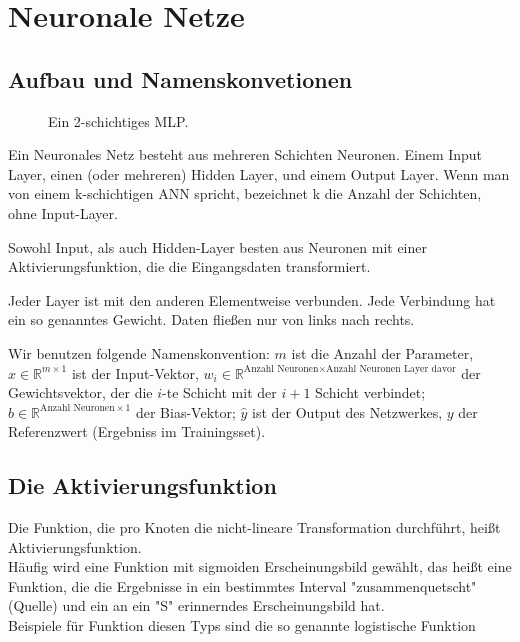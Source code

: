 \section{Neuronale Netze} %

\subsection{Aufbau und Namenskonvetionen}
\begin{figure}[ht!]
  \centering
    
  \caption{Ein 2-schichtiges MLP.}
\end{figure}


Ein Neuronales Netz besteht aus mehreren Schichten Neuronen. Einem Input Layer, einen (oder mehreren) Hidden Layer, und einem Output Layer. 
Wenn man von einem k-schichtigen ANN spricht, bezeichnet k die Anzahl der Schichten, ohne Input-Layer.

Sowohl Input, als auch Hidden-Layer besten aus Neuronen mit einer Aktivierungsfunktion, die die Eingangsdaten transformiert.

Jeder Layer ist mit den anderen Elementweise verbunden. Jede Verbindung hat ein so genanntes Gewicht. Daten fließen nur von links nach rechts. 

Wir benutzen folgende Namenskonvention: $m$ ist die Anzahl der Parameter, $x \in \mathbb{R}^{m \times 1}$ ist der Input-Vektor, 
$w_i\in \mathbb{R}^{\text{Anzahl Neuronen} \times \text{Anzahl Neuronen Layer davor}}$ der Gewichtsvektor, der die $i$-te Schicht mit der $i+1$ Schicht verbindet; $b \in \mathbb{R}^{\text{Anzahl Neuronen} \times 1}$ der Bias-Vektor; $\hat{y}$ ist der Output des Netzwerkes, $y$ der Referenzwert (Ergebniss im Trainingsset).  

\subsection{Die Aktivierungsfunktion}
Die Funktion, die pro Knoten die nicht-lineare Transformation durchführt, heißt Aktivierungsfunktion. \\
Häufig wird eine Funktion mit sigmoiden Erscheinungsbild gewählt, das heißt eine Funktion, die die Ergebnisse in ein bestimmtes Interval "zusammenquetscht" (Quelle) und ein an ein "S" erinnerndes Erscheinungsbild hat. 
\\
Beispiele für Funktion diesen Typs sind die so genannte logistische Funktion


